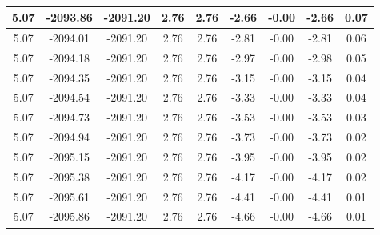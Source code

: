 \begin{table}[htbp]
\begin{adjustbox}{angle=90}
\begin{tabular}{|c|c|c|c|c|c|c|c|c|}
 5.07 & -2093.86 & -2091.20 & 2.76 & 2.76 & -2.66 & -0.00 & -2.66 & 0.07\\ \hline
 5.07 & -2094.01 & -2091.20 & 2.76 & 2.76 & -2.81 & -0.00 & -2.81 & 0.06\\ \hline
 5.07 & -2094.18 & -2091.20 & 2.76 & 2.76 & -2.97 & -0.00 & -2.98 & 0.05\\ \hline
 5.07 & -2094.35 & -2091.20 & 2.76 & 2.76 & -3.15 & -0.00 & -3.15 & 0.04\\ \hline
 5.07 & -2094.54 & -2091.20 & 2.76 & 2.76 & -3.33 & -0.00 & -3.33 & 0.04\\ \hline
 5.07 & -2094.73 & -2091.20 & 2.76 & 2.76 & -3.53 & -0.00 & -3.53 & 0.03\\ \hline
 5.07 & -2094.94 & -2091.20 & 2.76 & 2.76 & -3.73 & -0.00 & -3.73 & 0.02\\ \hline
 5.07 & -2095.15 & -2091.20 & 2.76 & 2.76 & -3.95 & -0.00 & -3.95 & 0.02\\ \hline
 5.07 & -2095.38 & -2091.20 & 2.76 & 2.76 & -4.17 & -0.00 & -4.17 & 0.02\\ \hline
 5.07 & -2095.61 & -2091.20 & 2.76 & 2.76 & -4.41 & -0.00 & -4.41 & 0.01\\ \hline
 5.07 & -2095.86 & -2091.20 & 2.76 & 2.76 & -4.66 & -0.00 & -4.66 & 0.01\\ \hline
            \end{tabular}
        \end{adjustbox}
        \caption{}
        \label{}
    \end{table}
    